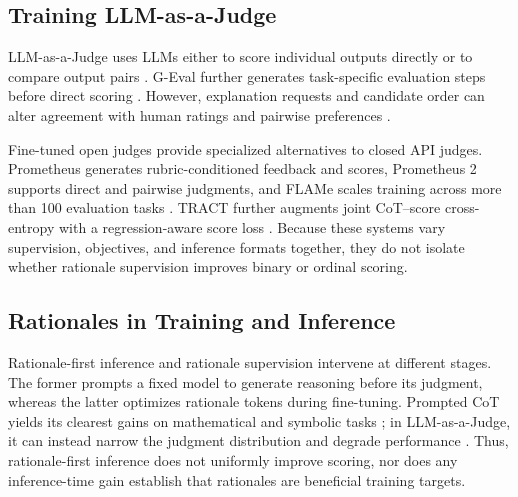 \subsection{Training LLM-as-a-Judge}
\label{sec:related-llm-judges}

LLM-as-a-Judge uses LLMs either to score individual outputs directly or to
compare output pairs
\citep{chiang-lee-2023-large,zheng-etal-2023-judging}. G-Eval further
generates task-specific evaluation steps before direct scoring
\citep{liu-etal-2023-g}. However, explanation requests and candidate order can
alter agreement with human ratings and pairwise preferences
\citep{chiang-lee-2023-closer,wang-etal-2024-large-language-models-fair}.

Fine-tuned open judges provide specialized alternatives to closed API judges.
Prometheus generates rubric-conditioned feedback and scores, Prometheus 2
supports direct and pairwise judgments, and FLAMe scales training across more
than 100 evaluation tasks
\citep{kim-etal-2024-prometheus-iclr,kim-etal-2024-prometheus,
vu-etal-2024-foundational}. TRACT further augments joint CoT--score
cross-entropy with a regression-aware score loss
\citep{chiang-etal-2025-tract}. Because these systems vary supervision,
objectives, and inference formats together, they do not isolate whether
rationale supervision improves binary or ordinal scoring.

\subsection{Rationales in Training and Inference}
\label{sec:related-rationale-supervision}

Rationale-first inference and rationale supervision intervene at different
stages. The former prompts a fixed model to generate reasoning before its
judgment, whereas the latter optimizes rationale tokens during fine-tuning.
Prompted CoT yields its clearest gains on mathematical and symbolic tasks
\citep{sprague-etal-2025-cot}; in LLM-as-a-Judge, it can instead narrow the
judgment distribution and degrade performance
\citep{wang-etal-2025-improving-llm-judge}. Thus, rationale-first inference
does not uniformly improve scoring, nor does any inference-time
gain establish that rationales are beneficial training targets.

